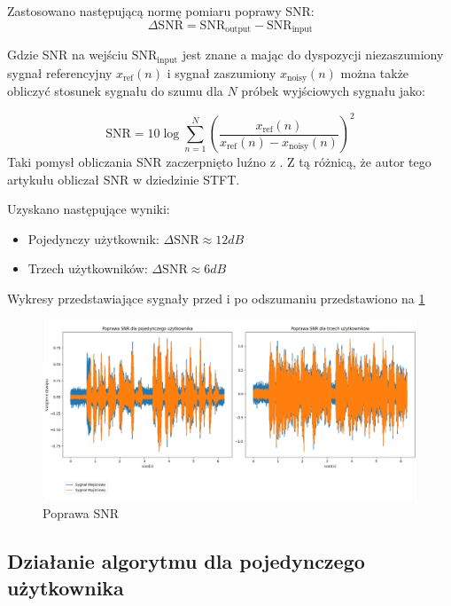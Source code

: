 \noindent Zastosowano następującą normę pomiaru poprawy SNR:
\begin{equation}
    \label{delta_SNR}
    \Delta \mathrm{SNR} = \mathrm{SNR}_{\mathrm{output}} - \mathrm{SNR}_{\mathrm{input}}
\end{equation}

\noindent Gdzie SNR na wejściu $\mathrm{SNR}_{\mathrm{input}}$ jest znane a mając do dyspozycji niezaszumiony sygnał referencyjny $x_{\mathrm{ref}}(n)$ i sygnał zaszumiony $x_{\mathrm{noisy}}(n)$ można także obliczyć stosunek sygnału do szumu dla $N$ próbek wyjściowych sygnału jako:

\begin{equation}
    \label{SNR}
    \mathrm{SNR} = 10 \log \sum_{n=1}^{N}\left(
    \dfrac
    {x_{\mathrm{ref}}(n)}
    {x_{\mathrm{ref}}(n)-x_{\mathrm{noisy}}(n)} \right)^{2}
\end{equation}
\noindent Taki pomysł obliczania SNR zaczerpnięto luźno z \cite{Virtanen2006}. Z tą różnicą, że autor tego artykułu obliczał SNR w dziedzinie STFT.

\noindent Uzyskano następujące wyniki:
\begin{itemize}
    \item Pojedynczy użytkownik: $\Delta \mathrm{SNR} \approx 12dB$ 
    \item Trzech użytkowników: $\Delta \mathrm{SNR} \approx 6dB$
\end{itemize}

\noindent Wykresy przedstawiające sygnały przed i po odszumaniu przedstawiono na \ref{fig:snr_boost}

\begin{figure}[H]
    \centering
    \includegraphics[width=\textwidth]{Images/snr_boost.png}
    \caption{Poprawa SNR}
    \label{fig:snr_boost}
\end{figure}

\subsection{Działanie algorytmu dla pojedynczego użytkownika}

